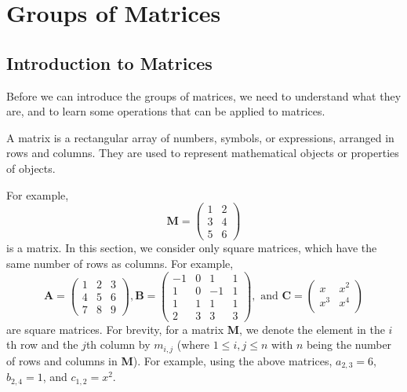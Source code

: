 \section{Groups of Matrices}\label{section-groups-of-matrices}
\subsection{Introduction to Matrices}\label{subsection-intro-to-matrices}
Before we can introduce the groups of matrices, we need to understand what they are, and to learn some operations that can be applied to matrices.

A matrix is a rectangular array of numbers, symbols, or expressions, arranged in rows and columns. They are used to represent mathematical objects or properties of objects.

For example,
\[
    \textbf{M} = \begin{pmatrix}
    1 & 2\\
    3 & 4\\
    5 & 6
    \end{pmatrix}
\]
is a matrix. In this section, we consider only square matrices, which have the same number of rows as columns. For example,
\[
    \textbf{A} = \begin{pmatrix}
    1 & 2 & 3\\
    4 & 5 & 6\\
    7 & 8 & 9
    \end{pmatrix}, \textbf{B} = \begin{pmatrix}
    -1 & 0 & 1 & 1\\
    1 & 0 & -1 & 1\\
    1 & 1 & 1 & 1\\
    2 & 3 & 3 & 3
    \end{pmatrix}, \textrm{ and } \textbf{C} = \begin{pmatrix}
    x & x^2\\
    x^3 & x^4\\
    \end{pmatrix}
\]
are square matrices. For brevity, for a matrix \textbf{M}, we denote the element in the $i$th row and the $j$th column by $m_{i,j}$ (where $1 \leq i, j \leq n$ with $n$ being the number of rows and columns in \textbf{M}). For example, using the above matrices, $a_{2,3} = 6$, $b_{2,4}=1$, and $c_{1,2} = x^2$.

